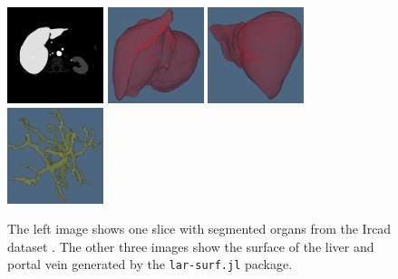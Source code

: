 \begin{figure}
\centering
\includegraphics[width=0.25\textwidth]{figs/ircad01_segmentation_65.png}%
\includegraphics[width=0.25\textwidth]{figs/liver_01_red_3.png}%
\includegraphics[width=0.25\textwidth]{figs/liver_01_red_4.png}%
\includegraphics[width=0.25\textwidth]{figs/portalvein_01_yellow_2.png}%
\caption{
The left image shows one slice 
with segmented organs from 
the Ircad dataset \cite{ircadb}.
The other three images show the surface of the liver and portal vein generated by the \texttt{lar-surf.jl} package.
} \label{fig:liver}
\end{figure}

